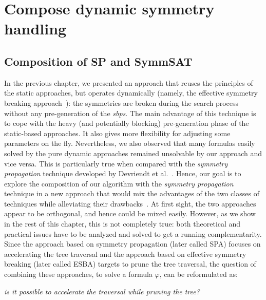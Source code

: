 \chapter{Compose dynamic symmetry handling}\label{chap:compose}
\minitoc
\section{Composition of SP and SymmSAT}
In the previous chapter, we presented an approach that reuses the
principles of the static approaches, but operates dynamically (namely, the effective symmetry breaking approach~\cite{metin2018cdclsym}):
 the symmetries are broken during the search process without any pre-generation of the \textit{sbps}. The main
advantage of this technique is to cope with the heavy (and potentially
blocking) pre-generation phase of the static-based approaches. It also gives
more flexibility for adjusting some parameters on the fly. 
Nevertheless, we also observed that many formulas easily solved by the pure
dynamic approaches remained unsolvable by our approach and vice versa. This is
particularly true when compared with the \textit{symmetry propagation} technique developed by
Devriendt et al.~\cite{Devriendt12}.
Hence, our goal is to explore the composition of our algorithm with the  \textit{symmetry propagation} technique in
a new approach that would mix the advantages of the two classes of techniques while alleviating their drawbacks~\cite{metin2019composing}. At first sight,
the two approaches appear to be orthogonal, and hence could be mixed easily. However, as we show in the rest of this chapter,
this is not completely true: both theoretical and practical issues have to be analyzed and solved to get a
running complementarity. 
Since the approach based on symmetry propagation (later called SPA) focuses on
accelerating the tree traversal and the approach based on effective symmetry
breaking (later called ESBA) targets to prune the tree traversal, the question of combining these approaches, to solve a formula $\varphi$, can
be reformulated as: 
\begin{center}
 \textit{is it possible to accelerate the traversal while pruning the tree?}
\end{center}
